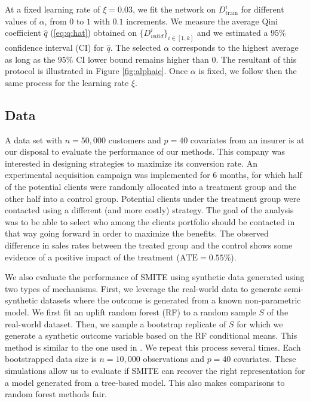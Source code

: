 \documentclass{article}
\begin{document}
At a fixed learning rate of $\xi=0.03$, we fit the network on $D^{i}_{\mathrm{train}}$ for different values of $\alpha$, from $0$ to $1$ with $0.1$ increments. We measure the average Qini coefficient $\hat q$ (\ref{eq:q:hat}) obtained on $\{D^{i}_{valid}\}_{i \in [1,k]}$ and we estimated a $95\%$ confidence interval (CI) for $\hat q$. The selected $\alpha$ corresponds to the highest average as long as the $95\%$ CI lower bound remains higher than $0$. The resultant of this protocol is illustrated in Figure \ref{fig:alphaie}. Once $\alpha$ is fixed, we follow then the same process for the learning rate $\xi$.




\subsection{Data}

A data set with $n=50,000$ customers and $p=40$ covariates from an insurer is at our disposal to evaluate the performance of our methods. This company was interested in designing strategies to maximize its conversion rate. An experimental acquisition campaign was implemented for 6 months, for which half of the potential clients were randomly allocated into a treatment group and the other half into a control group. Potential clients under the treatment group were contacted using a different (and more costly) strategy. The goal of the analysis was to be able to select who among the clients portfolio should be contacted in that way going forward in order to maximize the benefits. The observed difference in sales rates between the treated group and the control shows some evidence of a positive impact of the treatment ($\mathrm{ATE}=0.55\%$).

We also evaluate the performance of SMITE using synthetic data generated using two types of mechanisms. First, we leverage the real-world data to generate semi-synthetic datasets where the outcome is generated from a known non-parametric model. We first fit an uplift random forest (RF) to a random sample $S$ of the real-world dataset. Then, we sample a bootstrap replicate of $S$ for which we generate a synthetic outcome variable based on the RF conditional means. This method is similar to the one used in \cite{belba2019qbased}. We repeat this process several times. Each bootstrapped data size is $n=10,000$ observations and $p=40$ covariates. These simulations allow us to evaluate if SMITE can recover the right representation for a model generated from a tree-based model. This also makes comparisons to random forest methods fair. 
\end{document}
